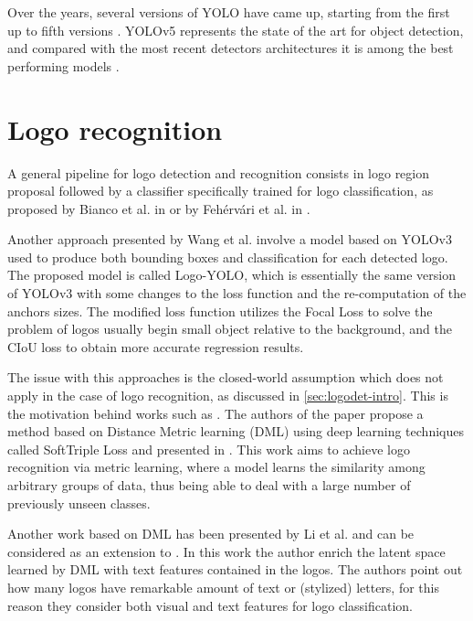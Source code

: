 Over the years, several versions of YOLO have came up, starting from the first up to fifth versions \cite{redmon2016you, redmon2017yolo9000, redmon2018yolov3, bochkovskiy2020yolov4, glenn_jocher_2021_5563715}. YOLOv5 represents the state of the art for object detection, and compared with the most recent detectors architectures it is among the best performing models \cite{zaidi2022survey}.

\section{Logo recognition}
\label{sec:sota-logoyolo}

A general pipeline for logo detection and recognition consists in logo region proposal followed by a classifier specifically trained for logo classification, as proposed by Bianco et al. in \cite{bianco2017deep} or by Fehérvári et al. in \cite{fehervari2019scalable}.

Another approach presented by Wang et al. \cite{wang2022logodet} involve a model based on YOLOv3 \cite{redmon2018yolov3} used to produce both bounding boxes and classification for each detected logo. The proposed model is called Logo-YOLO, which is essentially the same version of YOLOv3 with some changes to the loss function and the re-computation of the anchors sizes. The modified loss function utilizes the Focal Loss \cite{lin2017focal} to solve the problem of logos usually begin small object relative to the background, and the  CIoU loss \cite{zheng2020distance} to obtain more accurate regression results.

The issue with this approaches is the closed-world assumption which does not apply in the case of logo recognition, as discussed in \autoref{sec:logodet-intro}. This is the motivation behind works such as \cite{fehervari2019scalable}. The authors of the paper propose a method based on Distance Metric learning (DML) using deep learning techniques called SoftTriple Loss and presented in \cite{qian2019softtriple}. This work aims to achieve logo recognition via metric learning, where a model learns the similarity among arbitrary groups of data, thus being able to deal with a large number of previously unseen classes.

Another work based on DML has been presented by Li et al. \cite{li2022seetek} and can be considered as an extension to \cite{fehervari2019scalable}. In this work the author enrich the latent space learned by DML with text features contained in the logos. The authors point out how many logos have remarkable amount of text or (stylized) letters, for this reason they consider both visual and text features for logo classification.

